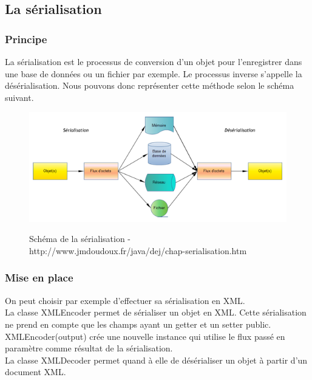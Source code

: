 \subsection{La sérialisation}

\subsubsection{Principe}

La sérialisation est le processus de conversion d'un objet pour l'enregistrer dans une base de données ou un fichier par exemple. Le processus inverse s'appelle la désérialisation. Nous pouvons donc représenter cette méthode selon le schéma suivant. 

\begin{figure}[H]
  \center
  \includegraphics[scale=0.5]{../graph/serialisation.png} \\
  \caption{Schéma de la sérialisation - http://www.jmdoudoux.fr/java/dej/chap-serialisation.htm}
\end{figure}

\subsubsection{Mise en place}
On peut choisir par exemple d'effectuer sa sérialisation en XML. \\

La classe XMLEncoder permet de sérialiser un objet en XML. Cette sérialisation ne prend en compte que les champs ayant un getter et un setter public. XMLEncoder(output) crée une nouvelle instance qui utilise le flux passé en paramètre comme résultat de la sérialisation. \\

La classe XMLDecoder permet quand à elle de désérialiser un objet à partir d'un document XML. \\

